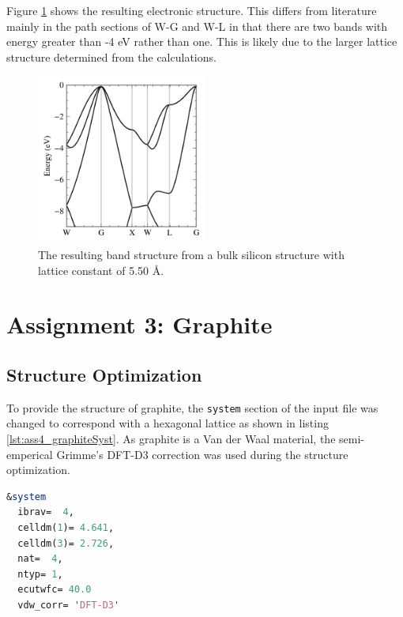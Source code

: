 \documentclass[10pt,a4paper]{labreport}
\begin{document}
Figure \ref{fig:ass3_bands} shows the resulting electronic structure. This differs from literature mainly in the path sections of W-G and W-L in that there are two bands with energy greater than -4 eV rather than one. This is likely due to the larger lattice structure determined from the calculations.  

\begin{figure}[h]
    \centering 
    \includegraphics[width = 0.5\textwidth]{figs/ass3_bands.png}
    \caption{The resulting band structure from a bulk silicon structure with lattice constant of 5.50 \AA. }
    \label{fig:ass3_bands}
\end{figure}


\newpage
\section{Assignment 3: Graphite}

\subsection{Structure Optimization}
To provide the structure of graphite, the \texttt{system} section of the input file was changed to correspond with a hexagonal lattice as shown in listing \ref{lst:ass4_graphiteSyst}.  As graphite is a Van der Waal material, the semi-emperical Grimme's DFT-D3 correction was used during the structure optimization. 

\begin{lstlisting}[language=Perl, 
    caption={The change to the \texttt{system} section of the input file. celldm(1) corresponds to the lattice paramters 'a', while celldm(3) is the ratio between lattice constants: c/a.},
    label=lst:ass4_graphiteSyst,
    ]
&system    
  ibrav=  4, 
  celldm(1)= 4.641, 
  celldm(3)= 2.726, 
  nat=  4, 
  ntyp= 1,
  ecutwfc= 40.0
  vdw_corr= 'DFT-D3'
\end{lstlisting} 
\end{document}
